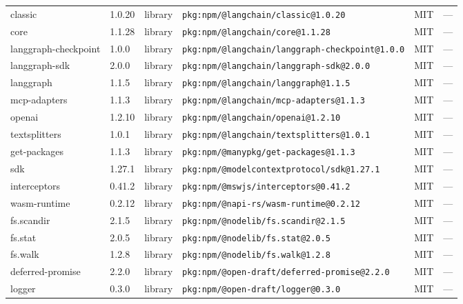 \documentclass[11pt,a4paper]{article}
\begin{document}
\begin{longtable}{|p{4cm}|p{2cm}|p{1.6cm}|p{5cm}|p{1.5cm}|p{3.5cm}|}
\raggedright classic & 1.0.20 & library & \small\texttt{pkg:npm/@langchain/classic@1.0.20} & MIT & \small — \\
\raggedright core & 1.1.28 & library & \small\texttt{pkg:npm/@langchain/core@1.1.28} & MIT & \small — \\
\raggedright langgraph-checkpoint & 1.0.0 & library & \small\texttt{pkg:npm/@langchain/langgraph-checkpoint@1.0.0} & MIT & \small — \\
\raggedright langgraph-sdk & 2.0.0 & library & \small\texttt{pkg:npm/@langchain/langgraph-sdk@2.0.0} & MIT & \small — \\
\raggedright langgraph & 1.1.5 & library & \small\texttt{pkg:npm/@langchain/langgraph@1.1.5} & MIT & \small — \\
\raggedright mcp-adapters & 1.1.3 & library & \small\texttt{pkg:npm/@langchain/mcp-adapters@1.1.3} & MIT & \small — \\
\raggedright openai & 1.2.10 & library & \small\texttt{pkg:npm/@langchain/openai@1.2.10} & MIT & \small — \\
\raggedright textsplitters & 1.0.1 & library & \small\texttt{pkg:npm/@langchain/textsplitters@1.0.1} & MIT & \small — \\
\raggedright get-packages & 1.1.3 & library & \small\texttt{pkg:npm/@manypkg/get-packages@1.1.3} & MIT & \small — \\
\raggedright sdk & 1.27.1 & library & \small\texttt{pkg:npm/@modelcontextprotocol/sdk@1.27.1} & MIT & \small — \\
\raggedright interceptors & 0.41.2 & library & \small\texttt{pkg:npm/@mswjs/interceptors@0.41.2} & MIT & \small — \\
\raggedright wasm-runtime & 0.2.12 & library & \small\texttt{pkg:npm/@napi-rs/wasm-runtime@0.2.12} & MIT & \small — \\
\raggedright fs.scandir & 2.1.5 & library & \small\texttt{pkg:npm/@nodelib/fs.scandir@2.1.5} & MIT & \small — \\
\raggedright fs.stat & 2.0.5 & library & \small\texttt{pkg:npm/@nodelib/fs.stat@2.0.5} & MIT & \small — \\
\raggedright fs.walk & 1.2.8 & library & \small\texttt{pkg:npm/@nodelib/fs.walk@1.2.8} & MIT & \small — \\
\raggedright deferred-promise & 2.2.0 & library & \small\texttt{pkg:npm/@open-draft/deferred-promise@2.2.0} & MIT & \small — \\
\raggedright logger & 0.3.0 & library & \small\texttt{pkg:npm/@open-draft/logger@0.3.0} & MIT & \small — \\

\end{longtable}
\end{document}
